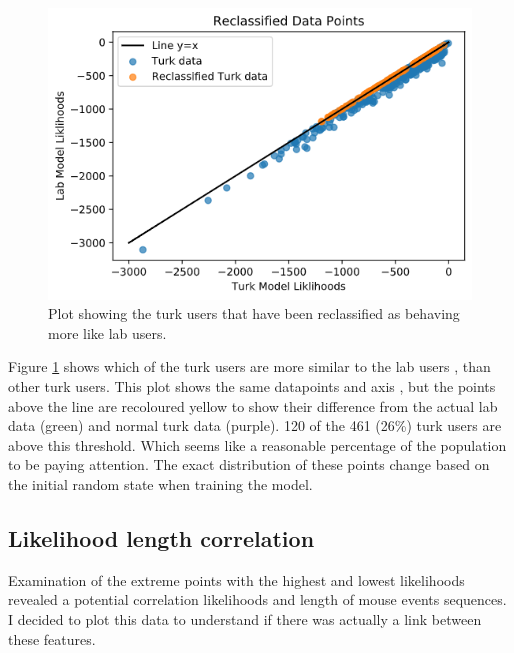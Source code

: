 \documentclass{article}
\begin{document}
\begin{figure}[ht!]
    \centering
    \includegraphics[scale=0.5]{Images/Reclassified-Data.png}
    \caption{Plot showing the turk users that have been reclassified as behaving more like lab users. }
    \label{fig:Reclassified}
\end{figure}

Figure \ref{fig:Reclassified} shows which of the turk users are more similar to the lab users
, than other turk users. 
This plot shows the same datapoints and axis
, but the points above the line are recoloured yellow to show their difference from the actual lab data (green) and normal turk data (purple). 
120 of the 461 (26\%) turk users are above this threshold. 
Which seems like a reasonable percentage of the population to be paying attention. 
The exact distribution of these points change based on the initial random state when training the model.

\subsection{Likelihood length correlation}

Examination of the extreme points with the highest and lowest likelihoods revealed a potential correlation likelihoods and length of mouse events sequences.
I decided to plot this data to understand if there was actually a link between these features.
\end{document}
